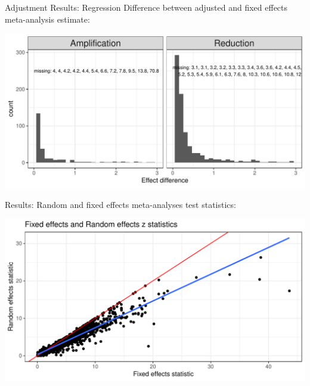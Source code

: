 \documentclass[english]{beamer}\usepackage[]{graphicx}\usepackage[]{color}
\makeatletter
\def\maxwidth{ %
  \ifdim\Gin@nat@width>\linewidth
    \linewidth
  \else
    \Gin@nat@width
  \fi
}
\newenvironment{knitrout}{}{} %
\makeatother
\begin{document}
\begin{frame}[fragile]{Adjustment Results: Regression}
Difference between adjusted and fixed effects meta-analysis estimate:

\vspace{-3mm}
\begin{knitrout}
\color{fgcolor}
\includegraphics[width=\maxwidth]{figure/unnamed-chunk-14-1} 

\end{knitrout}
\end{frame}


\begin{frame}[fragile]{Results:}
Random and fixed effects meta-analyses test statistics:

\vspace{-3mm} 
\begin{knitrout}
\color{fgcolor}
\includegraphics[width=\maxwidth]{figure/unnamed-chunk-15-1} 

\end{knitrout}
\end{frame}
\end{document}
